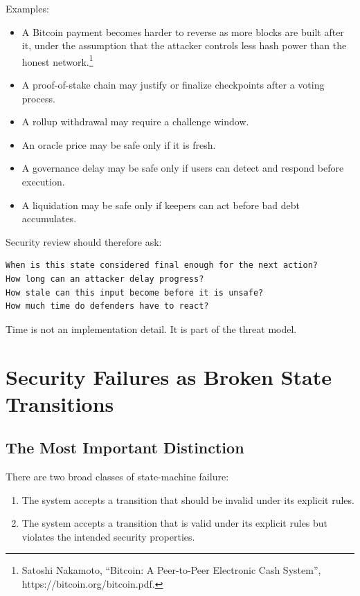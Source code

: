 Examples:

\begin{itemize}
\tightlist
\item
  A Bitcoin payment becomes harder to reverse as more blocks are built
  after it, under the assumption that the attacker controls less hash
  power than the honest network.\footnote{Satoshi Nakamoto, ``Bitcoin: A
    Peer-to-Peer Electronic Cash System'',
    https://bitcoin.org/bitcoin.pdf.}
\item
  A proof-of-stake chain may justify or finalize checkpoints after a
  voting process.
\item
  A rollup withdrawal may require a challenge window.
\item
  An oracle price may be safe only if it is fresh.
\item
  A governance delay may be safe only if users can detect and respond
  before execution.
\item
  A liquidation may be safe only if keepers can act before bad debt
  accumulates.
\end{itemize}

Security review should therefore ask:

\begin{lstlisting}
When is this state considered final enough for the next action?
How long can an attacker delay progress?
How stale can this input become before it is unsafe?
How much time do defenders have to react?
\end{lstlisting}

Time is not an implementation detail. It is part of the threat model.

\section{Security Failures as Broken State Transitions}

\subsection{The Most Important Distinction}

There are two broad classes of state-machine failure:

\begin{enumerate}
\def\labelenumi{\arabic{enumi}.}
\tightlist
\item
  The system accepts a transition that should be invalid under its
  explicit rules.
\item
  The system accepts a transition that is valid under its explicit rules
  but violates the intended security properties.
\end{enumerate}

